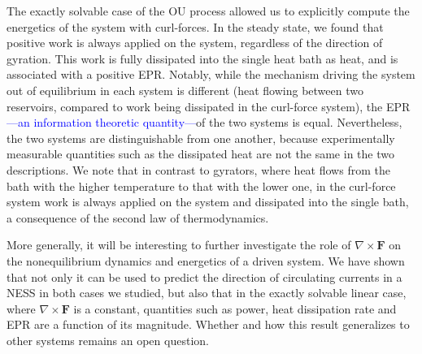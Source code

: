 The exactly solvable case of the OU process allowed us to explicitly compute the energetics of the system with curl-forces. In the steady state, we found that positive work is always applied on the system, regardless of the direction of gyration. This work is fully dissipated into the single heat bath as heat, and is associated with a positive EPR. Notably, while the mechanism driving the system out of equilibrium in each system is different (heat flowing between two reservoirs, compared to work being dissipated in the curl-force system), the EPR\textcolor{blue}{---an information theoretic quantity---}of the two systems is equal. Nevertheless, the two systems are distinguishable from one another, because experimentally measurable quantities such as the dissipated heat are not the same in the two descriptions.
We note that in contrast to gyrators, where heat flows from the bath with the higher temperature to that with the lower one, in the curl-force system work is always applied on the system and dissipated into the single bath, a consequence of the second law of thermodynamics.


More generally, it will be interesting to further investigate the role of $\nabla \times \mathbf{F}$ on the nonequilibrium dynamics and energetics of a driven system. We have shown that not only it can be used to predict the direction of circulating currents in a NESS in both cases we studied, but also that in the exactly solvable linear case, where $\nabla\times\mathbf{F}$ is a constant, quantities such as power, heat dissipation rate and EPR are a function of its magnitude. Whether and how this result generalizes to other systems remains an open question.


